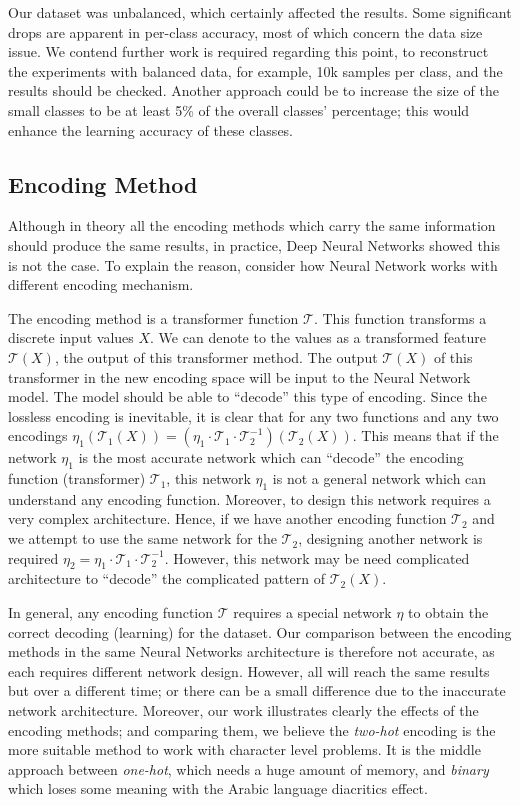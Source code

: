 Our dataset was unbalanced, which certainly affected the results. Some significant drops are apparent in per-class accuracy, most of which concern the data size issue. We contend further work is required regarding this point, to reconstruct the experiments with balanced data, for example, 10k samples per class, and the results should be checked. Another approach could be to increase the size of the small classes to be at least 5\% of the overall classes’ percentage; this would enhance the learning accuracy of these classes. 

\subsection{Encoding Method}

Although in theory all the encoding methods which carry the same information should produce the same results, in practice, Deep Neural Networks showed this is not the case. To explain the reason, consider how Neural Network works with different encoding mechanism.

The encoding method is a transformer function $\mathcal{T}$. This function transforms a discrete input values $X$. We can denote to the values as a transformed feature $\mathcal{T}(X)$, the output of this transformer method. The output $\mathcal{T}(X)$ of this transformer in the new encoding space will be input to the Neural Network model. The model should be able to ``decode'' this type of encoding. Since the lossless encoding is inevitable, it is clear that for any two functions and any two encodings $\eta_1\left(\mathcal{T}_1(X)\right) = \left(\eta_1\cdot\mathcal{T}_1\cdot \mathcal{T}_2^{-1} \right)\left(\mathcal{T}_2(X)\right)$. This means that if the network $\eta_1$ is the most accurate network which can ``decode'' the encoding function (transformer) $\mathcal{T}_1$, this network $\eta_1$ is not a general network which can understand any encoding function. Moreover, to design this network requires a very complex architecture. Hence, if we have another encoding function $\mathcal{T}_2$ and we attempt to use the same network for the $\mathcal{T}_2$, designing another network is required $\eta_2 = \eta_1\cdot\mathcal{T}_1\cdot \mathcal{T}_2^{-1}$. However, this network may be need complicated architecture to ``decode'' the complicated pattern of $\mathcal{T}_2(X)$.


In general, any encoding function $\mathcal{T}$ requires a special network $\eta$ to obtain the correct decoding (learning) for the dataset. Our comparison between the encoding methods in the same Neural Networks architecture is therefore not accurate, as each requires different network design. However, all will reach the same results but over a different time; or there can be a small difference due to the inaccurate network architecture. Moreover, our work illustrates clearly the effects of the encoding methods; and comparing them, we believe the \textit{two-hot} encoding is the more suitable method to work with character level problems. It is the middle approach between \textit{one-hot}, which needs a huge amount of memory, and \textit{binary} which loses some meaning with the Arabic language diacritics effect.


